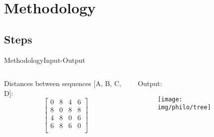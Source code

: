 \documentclass[10pt]{beamer}
\newcommand{\1}{
	\setbeamertemplate{background}{
		\texttt{[image: img/1]}
		\tikz[overlay] \fill[fill opacity=0.75,fill=white] (0,0) rectangle (-\paperwidth,\paperheight);
	}
}
\begin{document}
\section{Methodology}

\subsection{Steps}

\begin{frame}{Methodology}{Input-Output}
	\begin{columns}
		\begin{column}{0.48\textwidth}
			Distances between sequences [A, B, C, D]:
			\begin{equation*}			
				\begin{bmatrix}
				0 & 8 & 4 & 6 \\
				8 & 0 & 8 & 8 \\
				4 & 8 & 0 & 6 \\
				6 & 8 & 6 & 0 \\
				\end{bmatrix}			
			\end{equation*}
		\end{column}
		\begin{column}{0.48\textwidth}
			Output:
				\begin{figure}
					\texttt{[image: img/philo/tree]}
			\end{figure}
		\end{column}
	\end{columns}
\end{frame}
\end{document}
